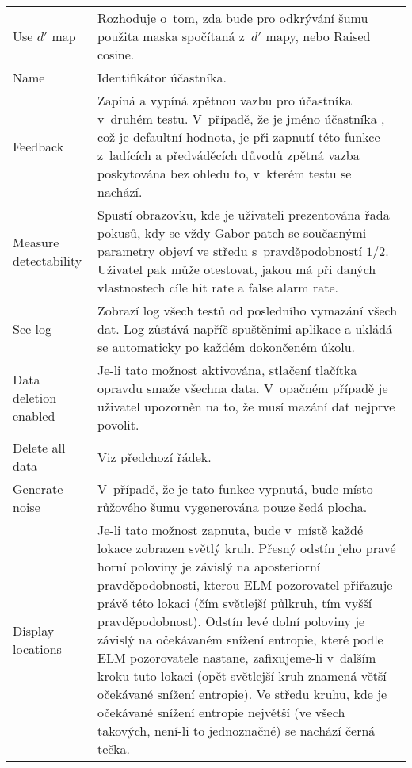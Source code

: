 {\begin{longtable}{R{0.25\textwidth}p{0.7\textwidth}}
Use $d'$ map & Rozhoduje o~tom, zda bude pro odkrývání šumu použita maska
spočítaná z~$d'$ mapy, nebo Raised cosine.\\

Name & Identifikátor účastníka.\\

Feedback & Zapíná a vypíná zpětnou vazbu pro účastníka v~druhém testu.
V~případě, že je jméno účastníka , což je defaultní hodnota, je při
zapnutí této funkce z~ladících a předváděcích důvodů zpětná vazba poskytována
bez ohledu to, v~kterém testu se nachází.\\

Measure detectability & Spustí obrazovku, kde je uživateli prezentována řada
pokusů, kdy se vždy Gabor patch se současnými parametry objeví ve středu
s~pravděpodobností $1/2$. Uživatel pak může otestovat, jakou má při daných
vlastnostech cíle hit rate a false alarm rate.\\

See log & Zobrazí log všech testů od posledního vymazání všech dat. Log zůstává
napříč spuštěními aplikace a ukládá se automaticky po každém dokončeném
úkolu.\\

Data deletion enabled & Je-li tato možnost aktivována, stlačení tlačítka
 opravdu smaže všechna data. V~opačném případě je uživatel
upozorněn na to, že musí mazání dat nejprve povolit.\\

Delete all data & Viz předchozí řádek.\\

Generate noise & V~případě, že je tato funkce vypnutá, bude místo růžového šumu
vygenerována pouze šedá plocha.\\

Display locations & Je-li tato možnost zapnuta, bude v~místě každé lokace
zobrazen světlý kruh. Přesný odstín jeho pravé horní poloviny je závislý na
aposteriorní pravděpodobnosti, kterou ELM pozorovatel přiřazuje právě této
lokaci (čím světlejší půlkruh, tím vyšší pravděpodobnost). Odstín levé dolní
poloviny je závislý na očekávaném snížení entropie, které podle ELM
pozorovatele nastane, zafixujeme-li v~dalším kroku tuto lokaci (opět světlejší
kruh znamená větší očekávané snížení entropie). Ve středu kruhu, kde je
očekávané snížení entropie největší (ve všech takových, není-li to jednoznačné)
se nachází černá tečka. \\

\end{longtable}
 }

